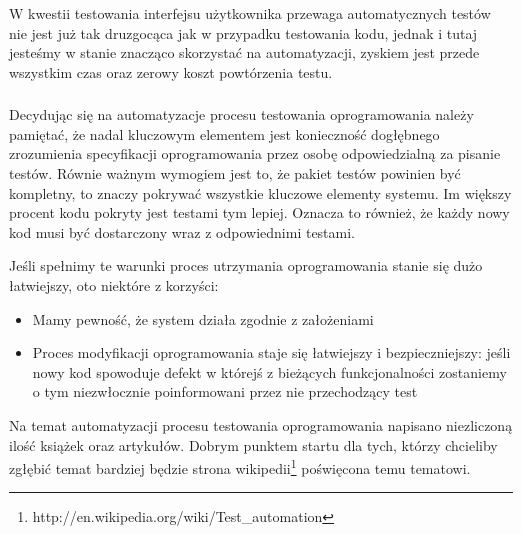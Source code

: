         W kwestii testowania interfejsu użytkownika przewaga automatycznych testów nie jest już tak druzgocąca jak w przypadku testowania kodu, jednak i tutaj jesteśmy w stanie znacząco skorzystać na automatyzacji, zyskiem jest przede wszystkim czas oraz zerowy koszt powtórzenia testu.
        
      \subsubsection{}

        Decydując się na automatyzacje procesu testowania oprogramowania należy pamiętać, że nadal kluczowym elementem jest konieczność dogłębnego zrozumienia specyfikacji oprogramowania przez osobę odpowiedzialną za pisanie testów. Równie ważnym wymogiem jest to, że pakiet testów powinien być kompletny, to znaczy pokrywać wszystkie kluczowe elementy systemu. Im większy procent kodu pokryty jest testami tym lepiej. Oznacza to również, że każdy nowy kod musi być dostarczony wraz z odpowiednimi testami.
        
        Jeśli spełnimy te warunki proces utrzymania oprogramowania stanie się dużo łatwiejszy, oto niektóre z korzyści:
        
         \begin{itemize}
     	    \item Mamy pewność, że system działa zgodnie z założeniami
     	    \item Proces modyfikacji oprogramowania staje się łatwiejszy i bezpieczniejszy: jeśli nowy kod spowoduje defekt w którejś z bieżących funkcjonalności zostaniemy o tym niezwłocznie poinformowani przez nie przechodzący test
     	  \end{itemize}
     	  
     	  Na temat automatyzacji procesu testowania oprogramowania napisano niezliczoną ilość książek oraz artykułów. Dobrym punktem startu dla tych, którzy chcieliby zgłębić temat bardziej będzie strona wikipedii\footnote{http://en.wikipedia.org/wiki/Test\_automation} \nocite{wiki_test_automation} poświęcona temu tematowi.

